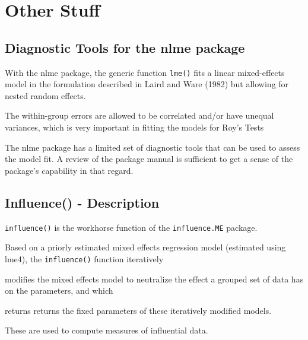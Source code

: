 \documentclass[12pt, a4paper]{report}
\theoremstyle{plain}
\theoremstyle{definition}
\theoremstyle{remark}
\begin{document}
\chapter{Other Stuff}

\section{Diagnostic Tools for the nlme package}


With the nlme package, the generic function \texttt{lme()} fits a linear mixed-effects model in the formulation described in Laird and Ware (1982) but allowing for nested random effects. 

The within-group errors are allowed to be correlated and/or have unequal variances, which is very important in fitting the models for Roy's Tests

The nlme package has a limited set of diagnostic tools that can be used to assess the model fit. A review of the package manual is sufficient to get a sense of the package's capability in that regard.




\section*{Influence() - Description}
\texttt{influence()} is the workhorse function of the \texttt{influence.ME} package. 


Based on a priorly estimated mixed effects regression model (estimated using lme4), the \texttt{influence()} function iteratively 

modifies the mixed effects model to neutralize the effect a grouped set of data has on the parameters, and which 

returns returns the fixed parameters of these iteratively modified models. 

These are used to compute measures of influential data.




%	
%
%
\end{document}
